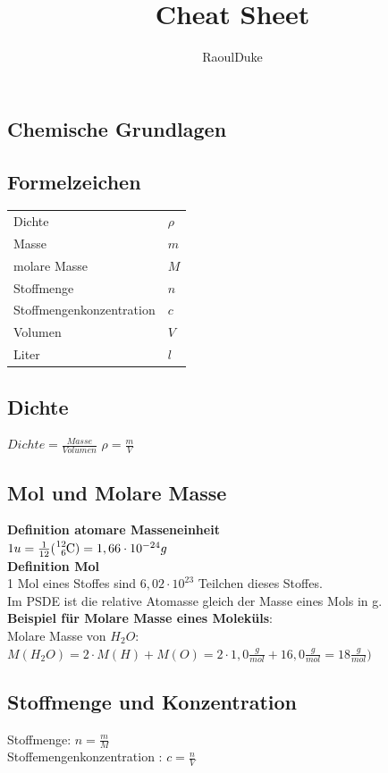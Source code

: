 \documentclass[eglish/german]{latex4ei/latex4ei_sheet}
\title{Cheat Sheet}
\author{RaoulDuke}
\begin{document}
\ifdefined\GitRevision{}\fi

\maketitle   %


\begin{sectionbox}
	\section{Chemische Grundlagen}
	\subsection{Formelzeichen}
		\begin{tabular}{ll}
			Dichte & $\rho$\\
			Masse & $m$\\
			molare Masse & $M$\\
			Stoffmenge & $n$\\
			Stoffmengenkonzentration & $c$\\
			Volumen & $V$\\
			Liter	& $l$\\
		\end{tabular}

	\subsection{Dichte}
		$ Dichte =  \frac{Masse}{Volumen}$  $ \rho = \frac{m}{V}$
	
	\subsection{Mol und Molare Masse }
		\textbf {Definition atomare Masseneinheit}\\
		$1u = \frac{1}{12}(\ce{^{12}_{6}C}) = 1,66 \cdot 10^{-24}g$\\
		\textbf {Definition Mol}\\
		1 Mol eines Stoffes sind $6,02 \cdot 10^23$ Teilchen dieses Stoffes.\\
		Im PSDE ist die relative Atomasse gleich der Masse eines Mols in g.\\
		\textbf{Beispiel für Molare Masse eines Moleküls}:\\
		Molare Masse von $H_2O$: $M(H_2O) = 2 \cdot M(H)+ M(O) = 2\cdot 1,0\frac{g}{mol} + 16,0\frac{g}{mol}= 18 \frac{g}{mol})$\\
	
	\subsection{Stoffmenge und Konzentration}
		Stoffmenge: $n = \frac{m}{M}$\\
		Stoffemengenkonzentration : $c = \frac{n}{V}$
	\end{sectionbox}
\end{document}
